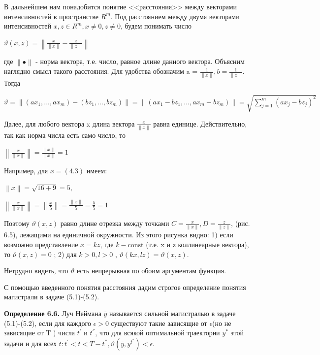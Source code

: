 \documentclass[12pt, 4paper]{book}
\begin{document}
{В дальнейшем нам понадобится понятие <<расстояния>> между векторами интенсивностей в пространстве $R^m$. Под расстоянием между двумя векторами интенсивностей $x,z \in R^m,x \neq 0,z \neq 0$, будем понимать число
\begin{center}
$\vartheta (x,z) = \left\|\frac{x}{\left\|x\right\|} - \frac{z}{\left\|z\right\|}\right\|$
\end{center}
где $\left\|\bullet\right\|$ - норма вектора, т.е. число, равное длине данного вектора. Объясним наглядно смысл такого расстояния. Для удобства обозначим a = $\frac{1}{\left\|x\right\|},b=\frac{1}{\left\|z\right\|}$. Тогда
\begin{center}
$\vartheta = \left\|(a x_1,...,a x_m) - (b z_1,...,b z_m)\right\| = \left\|(a x_1 - b z_1,...,a x_m - b z_m)\right\|= \sqrt{\sum\limits_{j=1}^{m}(a x_j - b z_j)^2}$
\end{center}
\par

Далее, для любого вектора x длина вектора $\frac{x}{\left\|x\right\|}$ равна единице. Действительно, так как норма числа есть само число, то 
\begin{center}
$\left\|\frac{x}{\left\|x\right\|}\right\|=\frac{\left\|x\right\|}{\left\|x\right\|}=1$
\end{center}
Например, для $x=(4.3)$  имеем:
\begin{center}
$\left\|x\right\|=\sqrt{16+9}=5,$
\end{center}
\begin{center}
$\left\|\frac{x}{\left\|x\right\|}\right\|=\left\|\frac{x}{5}\right\|=\frac{\left\|x\right\|}{5}=\frac{5}{5}=1$
\end{center}
Поэтому $\vartheta(x,z)$ равно длине отрезка между точками $C = \frac{x}{\left\|x\right\|} ,D = \frac{z}{\left\|z\right\|}$,  (рис. 6.5), лежащими на единичной окружности. Из этого рисунка видно: 
1) если возможно представление $x = kz$, где $k - \text{const}$ (т.е. x и z коллинеарные вектора), то $\vartheta (x,z)=0$ ;
2) для $k >0, l>0$ , $\vartheta (kx,lz)=\vartheta (x,z)$.
\par

Нетрудно видеть, что $\vartheta$ есть непрерывная по обоим аргументам функция.
\par

С помощью введенного понятия расстояния дадим строгое определение понятия магистрали в задаче (5.1)-(5.2).
\par

\textbf{Определение 6.6.} Луч Неймана $\bar{y}$ называется сильной магистралью в задаче (5.1)-(5.2), если для каждого $\epsilon > 0$ существуют такие зависящие от $\epsilon$(но не зависящие от T ) числа $t^{'}$ и $t^{''}$, что для всякой оптимальной траектории $y^{*}$ этой задачи и для всех $t:t^{'}<t<T-t^{''}, \vartheta (\bar{y},y^{t^*})< \epsilon$. 
\par

}
\end{document}
